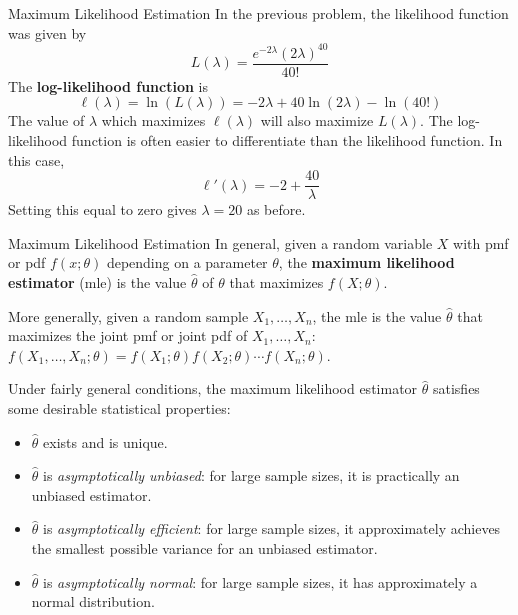 \documentclass{beamer}
\renewcommand{\emph}{\textbf}
\begin{document}
\begin{frame}{Maximum Likelihood Estimation}
In the previous problem, the likelihood function was given by
$$L(\lambda)=\frac{e^{-2\lambda}(2\lambda)^{40}}{40!}$$
\pause The \emph{log-likelihood function} is
$$\ell(\lambda) = \ln(L(\lambda)) = -2\lambda+40\ln(2\lambda)-\ln(40!)$$
\pause The value of $\lambda$ which maximizes $\ell(\lambda)$ will also maximize $L(\lambda)$. The log-likelihood function is often easier to differentiate than the likelihood function. 
\pause In this case,
$$\ell'(\lambda) = -2+\frac{40}\lambda$$
\pause Setting this equal to zero gives $\lambda=20$ as before.
\end{frame}
%
\begin{frame}{Maximum Likelihood Estimation}
In general, given a random variable $X$ with pmf or pdf $f(x; \theta)$ depending on a parameter $\theta$, the \emph{maximum likelihood estimator} (mle) is the value $\hat\theta$ of $\theta$ that maximizes $f(X; \theta)$. 

\vspace{.2cm}
\pause More generally, given a random sample $X_1,\dots,X_n$, the mle is the value $\hat\theta$ that maximizes the joint pmf or joint pdf of $X_1,\dots,X_n$: $f(X_1,\dots,X_n; \theta)=f(X_1;\theta)f(X_2;\theta)\cdots f(X_n;\theta)$.

\pause \vspace{.2cm}Under fairly general conditions, the maximum likelihood estimator $\hat\theta$ satisfies some desirable statistical properties:
\begin{itemize}
\pause \item $\hat\theta$ exists and is unique.
\pause \item $\hat\theta$ is \textit{asymptotically unbiased}: for large sample sizes, it is practically an unbiased estimator. 
\pause \item $\hat\theta$ is \textit{asymptotically efficient}: for large sample sizes, it approximately achieves the smallest possible variance for an unbiased estimator.
\pause \item $\hat\theta$ is \textit{asymptotically normal}: for large sample sizes, it has approximately a normal distribution.
\end{itemize}
\end{frame}
\end{document}
